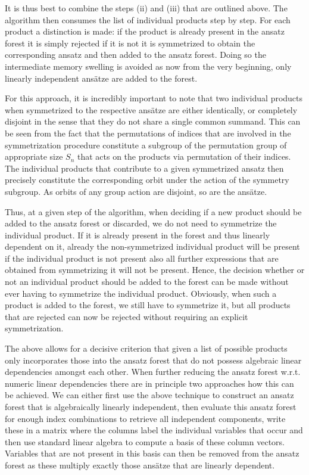 It is thus best to combine the steps (ii) and (iii) that are outlined above. The algorithm then consumes the list of individual products step by step. For each product a distinction is made: if the product is already present in the ansatz forest it is simply rejected if it is not it is symmetrized to obtain the corresponding ansatz and then added to the ansatz forest. Doing so the intermediate memory swelling is avoided as now from the very beginning, only linearly independent ansätze are added to the forest.

For this approach, it is incredibly important to note that two individual products when symmetrized to the respective ansätze are either identically, or completely disjoint in the sense that they do not share a single common summand. This can be seen from the fact that the permutations of indices that are involved in the symmetrization procedure constitute a subgroup of the permutation group of appropriate size $S_n$ that acts on the products via permutation of their indices. The individual products that contribute to a given symmetrized ansatz then precisely constitute the corresponding orbit under the action of the symmetry subgroup. As orbits of any group action are disjoint, so are the ansätze. 

Thus, at a given step of the algorithm, when deciding if a new product should be added to the ansatz forest or discarded, we do not need to symmetrize the individual product. If it is already present in the forest and thus linearly dependent on it, already the non-symmetrized individual product will be present if the individual product is not present also all further expressions that are obtained from symmetrizing it will not be present. Hence, the decision whether or not an individual product should be added to the forest can be made without ever having to symmetrize the individual product. Obviously, when such a product is added to the forest, we still have to symmetrize it, but all products that are rejected can now be rejected without requiring an explicit symmetrization.

The above allows for a decisive criterion that given a list of possible products only incorporates those into the ansatz forest that do not possess algebraic linear dependencies amongst each other. When further reducing the ansatz forest w.r.t. numeric linear dependencies there are in principle two approaches how this can be achieved. We can either first use the above technique to construct an ansatz forest that is algebraically linearly independent, then evaluate this ansatz forest for enough index combinations to retrieve all independent components, write these in a matrix where the columns label the individual variables that occur and then use standard linear algebra to compute a basis of these column vectors. Variables that are not present in this basis can then be removed from the ansatz forest as these multiply exactly those ansätze that are linearly dependent. 


